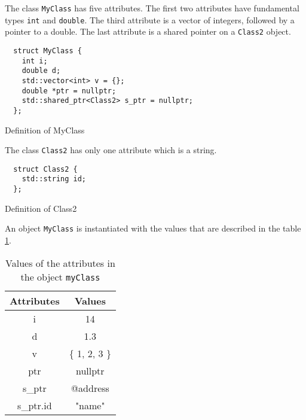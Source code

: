 The class \texttt{MyClass} has five attributes. The first two attributes have
fundamental types \texttt{int} and \texttt{double}. The third attribute is a
vector of integers, followed by a pointer to a double. The last attribute is a
shared pointer on a \texttt{Class2} object.

\clearpage{}
\begin{listing}[ht!]
\begin{verbatim}
  struct MyClass {
    int i;
    double d;
    std::vector<int> v = {};
    double *ptr = nullptr;
    std::shared_ptr<Class2> s_ptr = nullptr;
  };
\end{verbatim}
\caption{Definition of MyClass}
\label{lst:serexmyclass}
\end{listing}

The class \texttt{Class2} has only one attribute which is a string.

\begin{listing}[ht!]
\begin{verbatim}
  struct Class2 {
    std::string id;
  };
\end{verbatim}
\caption{Definition of Class2}
\label{lst:serexmysecondclass}
\end{listing}

An object \texttt{MyClass} is instantiated with the values that are described in
the table \ref{tbl:serexvals}.

\begin{table}[h!]
\centering
\begin{tabular}{|c|c|}
 \hline
 Attributes & Values \\
 \hline\hline
  i & 14 \\
 \hline
  d & 1.3 \\
 \hline
  v & \{ 1, 2, 3 \} \\
 \hline
  ptr & nullptr \\
 \hline
  s\_ptr & @address \\
 \hline\hline
  s\_ptr.id & "name" \\
 \hline
\end{tabular}
\caption{Values of the attributes in the object \texttt{myClass}}
\label{tbl:serexvals}
\end{table}

